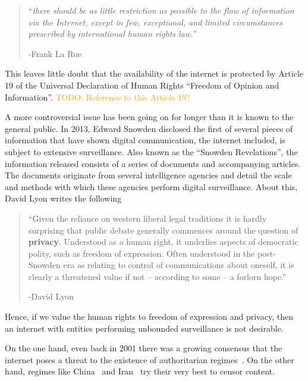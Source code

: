 \documentclass[a4paper,11pt]{book}
\newcommand\nicetohave[1]{\textcolor{orange}{TODO: #1}}
\theoremstyle{definition}
\begin{document}
\begin{quote}
    ``\textit{there should be as little restriction as possible  to  the  flow  of  information  via  the  Internet,
    except  in  few,  exceptional,  and  limited  circumstances  prescribed  by  international  human  rights  law.}'' 
    
    -Frank La Rue  
\end{quote}

This leaves little doubt that the availability of the internet is protected by Article 19 of
the Universal Declaration of Human Rights ``Freedom of Opinion and Information''. \nicetohave{Reference to this Article
19?}

A more controversial issue has been going on for longer than it is known to the general public.
In 2013, Edward Snowden disclosed the first of several pieces of information that
have shown digital communication, the internet included, is subject to extensive surveillance.
Also known as the ``Snowden Revelations'', the information released consists of a series
of documents and accompanying articles. The documents originate from several intelligence 
agencies and detail the scale and methods with which these agencies perform digital
surveillance. 
About this, David Lyon writes the following~\cite{lyon2014surveillance}

\begin{quote}
    ``Given the reliance on western liberal legal traditions
    it is hardly surprising that public debate generally 
    commences around the question of \textbf{privacy}.
    Understood as a human right, it underlies aspects of democratic polity,
    such as freedom of expression. 
    Often understood in the post-Snowden era as relating to 
    control of communications about oneself, 
    it is clearly a threatened value if not – according to some – a forlorn hope.''

    -David Lyon
\end{quote}

Hence, if we value the human rights to freedom of expression and privacy, then an internet
with entities performing unbounded surveillance is not desirable. 

On the one hand, even back in 2001 there was a growing consensus that the internet poses
a threat to the existence of authoritarian regimes~\cite{kalathil2001internet}. 
On the other hand, regimes like China~\cite{endeshaw2004internet} and Iran~\cite{kimppa2010emancipatory}
try their very best to censor content. 
\end{document}
